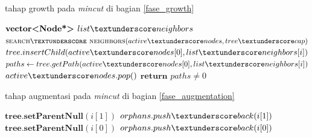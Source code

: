 \begin{algorithm}
    \caption{tahap growth pada \emph{mincut} di bagian \ref{fase_growth}}          
    \label{algo:fase_growth}                 
    \begin{algorithmic}            %
            \State $\textbf{vector<Node*> } list\textunderscore neighbors $
            \State $\Call{search\textunderscore neighbors}{active\textunderscore nodes, tree\textunderscore cap}$
                            \State $tree.insertChild(active\textunderscore nodes[0], list\textunderscore neighbors[i])$
                            \State $paths \gets tree.getPath(active\textunderscore nodes[0], list\textunderscore neighbors[i])$                    
                        \EndIf
                    \EndIf
                \EndFor
                \State $active\textunderscore nodes.pop()$
            \EndWhile
            \State $\textbf{return } paths \neq 0$
        \EndFunction
    \end{algorithmic}
\end{algorithm}

\begin{algorithm}
    \caption{tahap augmentasi pada \emph{mincut} di bagian \ref{fase_augmentation}}          
    \label{algo:fase_augmentation}                 
    \begin{algorithmic}            %
                    \State $\textbf{tree.setParentNull}(i[1])$
                    \State $orphans.push\textunderscore back(i[1])$
                    \State $\textbf{tree.setParentNull}(i[0])$
                    \State $orphans.push\textunderscore back(i[0])$
                \EndIf
            \EndFor
        \EndFunction
    \end{algorithmic}
\end{algorithm}

